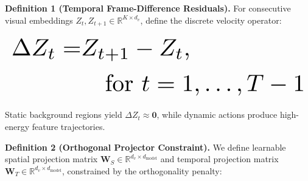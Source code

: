 \documentclass[10pt,journal,compsoc,twocolumn]{IEEEtran}
\begin{document}
\textbf{Definition 1 (Temporal Frame-Difference Residuals).} For consecutive visual embeddings $Z_t, Z_{t+1} \in \mathbb{R}^{K \times d_v}$, define the discrete velocity operator:

























\begin{equation}
\resizebox{\columnwidth}{!}{$\displaystyle
\begin{aligned}
\Delta Z_t = & Z_{t+1} - Z_t, \\
& \quad \text{for } t = 1, \ldots, T-1
\end{aligned}
$}
\end{equation}

























Static background regions yield $\Delta Z_t \approx \mathbf{0}$, while dynamic actions produce high-energy feature trajectories.

\textbf{Definition 2 (Orthogonal Projector Constraint).} We define learnable spatial projection matrix $\mathbf{W}_S \in \mathbb{R}^{d_v \times d_{\text{model}}}$ and temporal projection matrix $\mathbf{W}_T \in \mathbb{R}^{d_v \times d_{\text{model}}}$, constrained by the orthogonality penalty:
\end{document}
